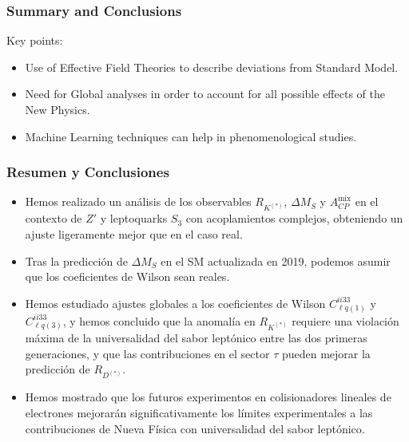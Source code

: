 \documentclass[mathserif, 10pt, dvipsnames]{beamer}
\begin{document}
\begin{frame}\frametitle{Summary and Conclusions}

Key points:

\vspace{0.5cm}

    \begin{itemize}
        \item Use of Effective Field Theories to describe deviations from Standard Model.
        \item Need for Global analyses in order to account for all possible effects of the New Physics.
        \item Machine Learning techniques can help in phenomenological studies.
    \end{itemize}
\end{frame}

\begin{frame}\frametitle{Resumen y Conclusiones}
    \begin{itemize}
        \item Hemos realizado un análisis de los observables $R_{K^{(*)}}$, $\Delta M_S$ y $A_{CP}^\mathrm{mix}$ en el contexto de $Z'$ y leptoquarks $S_3$ con acoplamientos complejos, obteniendo un ajuste ligeramente mejor que en el caso real.
        \item Tras la predicción de $\Delta M_S$ en el SM actualizada en 2019, podemos asumir que los coeficientes de Wilson sean reales.
        \item Hemos estudiado ajustes globales a los coeficientes de Wilson $C_{\ell q(1)}^{ii33}$ y $C_{\ell q (3)}^{ii33}$, y hemos concluido que la anomalía en $R_{K^{(*)}}$ requiere una violación máxima de la universalidad del sabor leptónico entre las dos primeras generaciones, y que las contribuciones en el sector $\tau$ pueden mejorar la predicción de $R_{D^{(*)}}$.
        \item Hemos mostrado que los futuros experimentos en colisionadores lineales de electrones mejorarán significativamente los límites experimentales a las contribuciones de Nueva Física con universalidad del sabor leptónico.
    \end{itemize}
\end{frame}
\end{document}
